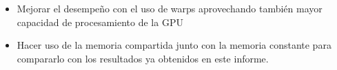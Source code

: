 \documentclass[10pt,journal,compsoc]{IEEEtran}
\begin{document}
\begin{itemize}
\item Mejorar el desempeño con el uso de warps aprovechando también mayor capacidad de procesamiento de la GPU
\item Hacer uso de la memoria compartida junto con la memoria constante para compararlo con los resultados ya obtenidos en este informe.
\end{itemize}


%





\end{document}
